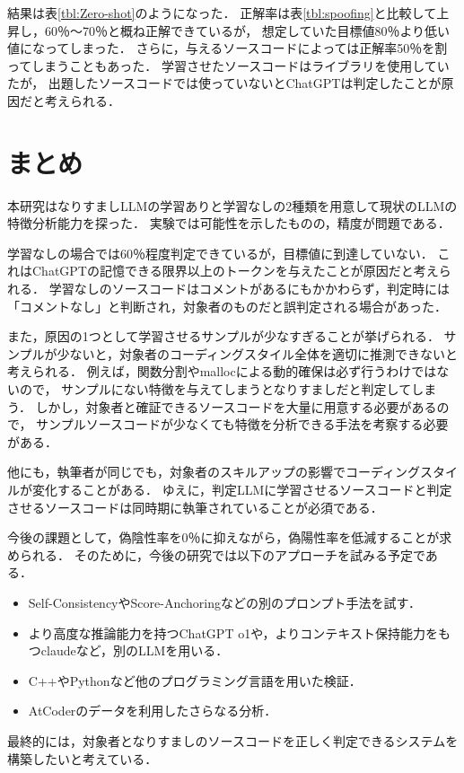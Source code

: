 \documentclass[twocolumn]{jarticle}
\begin{document}
結果は表\ref{tbl:Zero-shot}のようになった．
正解率は表\ref{tbl:spoofing}と比較して上昇し，60％～70％と概ね正解できているが，
想定していた目標値80％より低い値になってしまった．
さらに，与えるソースコードによっては正解率50％を割ってしまうこともあった．
学習させたソースコードはライブラリを使用していたが，
出題したソースコードでは使っていないとChatGPTは判定したことが原因だと考えられる．


\section{まとめ}

本研究はなりすましLLMの学習ありと学習なしの2種類を用意して現状のLLMの特徴分析能力を探った．
実験では可能性を示したものの，精度が問題である．

学習なしの場合では60％程度判定できているが，目標値に到達していない．
これはChatGPTの記憶できる限界以上のトークンを与えたことが原因だと考えられる．
学習なしのソースコードはコメントがあるにもかかわらず，判定時には「コメントなし」と判断され，対象者のものだと誤判定される場合があった．

また，原因の1つとして学習させるサンプルが少なすぎることが挙げられる．
サンプルが少ないと，対象者のコーディングスタイル全体を適切に推測できないと考えられる．
例えば，関数分割やmallocによる動的確保は必ず行うわけではないので，
サンプルにない特徴を与えてしまうとなりすましだと判定してしまう．
しかし，対象者と確証できるソースコードを大量に用意する必要があるので，
サンプルソースコードが少なくても特徴を分析できる手法を考察する必要がある．

他にも，執筆者が同じでも，対象者のスキルアップの影響でコーディングスタイルが変化することがある．
ゆえに，判定LLMに学習させるソースコードと判定させるソースコードは同時期に執筆されていることが必須である．

今後の課題として，偽陰性率を0％に抑えながら，偽陽性率を低減することが求められる．
そのために，今後の研究では以下のアプローチを試みる予定である．
\begin{itemize}
	\setlength{\parskip}{0cm} %
	\setlength{\itemsep}{0cm} %
  \item Self-Consistency\cite{lit:Xuezhi}やScore-Anchoringなどの別のプロンプト手法を試す．
  \item より高度な推論能力を持つChatGPT o1や，よりコンテキスト保持能力をもつclaudeなど，別のLLMを用いる．
  \item C++やPythonなど他のプログラミング言語を用いた検証．
  \item AtCoderのデータを利用したさらなる分析．
\end{itemize}
最終的には，対象者となりすましのソースコードを正しく判定できるシステムを構築したいと考えている．
\end{document}
